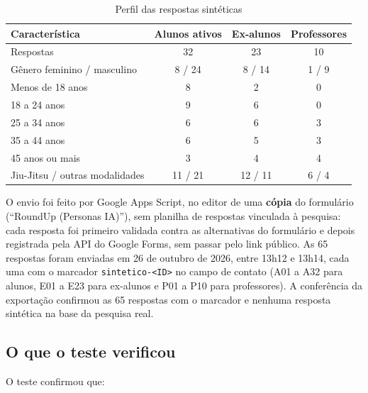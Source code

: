 \begin{table}[H]
  \centering
  \caption{Perfil das respostas sintéticas}
  \label{tab:perfil-personas}
  \footnotesize
  \begin{tabular}{lccc}
    \toprule
    \textbf{Característica} & \textbf{Alunos ativos} & \textbf{Ex-alunos} & \textbf{Professores} \\
    \midrule
    Respostas                           & 32 & 23 & 10 \\
    Gênero feminino / masculino         & 8 / 24 & 8 / 14 & 1 / 9 \\
    Menos de 18 anos                    & 8 & 2 & 0 \\
    18 a 24 anos                        & 9 & 6 & 0 \\
    25 a 34 anos                        & 6 & 6 & 3 \\
    35 a 44 anos                        & 6 & 5 & 3 \\
    45 anos ou mais                     & 3 & 4 & 4 \\
    Jiu-Jitsu / outras modalidades      & 11 / 21 & 12 / 11 & 6 / 4 \\
    \bottomrule
  \end{tabular}
\end{table}

O envio foi feito por Google Apps Script, no editor de uma
\textbf{cópia} do formulário (``RoundUp (Personas IA)''), sem planilha de
respostas vinculada à pesquisa: cada resposta foi primeiro validada contra
as alternativas do formulário e depois registrada pela API do Google
Forms, sem passar pelo link público. As 65 respostas foram enviadas em 26
de outubro de 2026, entre 13h12 e 13h14, cada uma com o marcador
\texttt{sintetico-<ID>} no campo de contato (A01 a A32 para alunos, E01 a
E23 para ex-alunos e P01 a P10 para professores). A conferência da
exportação confirmou as 65 respostas com o marcador e nenhuma resposta
sintética na base da pesquisa real.

\subsection{O que o teste verificou}

O teste confirmou que:

